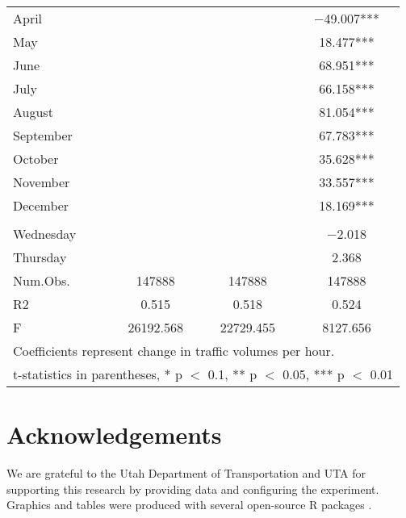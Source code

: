 \documentclass[3p, authoryear]{elsarticle} %
\begin{document}
\begin{table}
\begin{tabular}[t]{lccc}
\hspace{1em}April &  &  & \num{-49.007}***\\
\hspace{1em}May &  &  & \num{18.477}***\\
\hspace{1em}June &  &  & \num{68.951}***\\
\hspace{1em}July &  &  & \num{66.158}***\\
\hspace{1em}August &  &  & \num{81.054}***\\
\hspace{1em}September &  &  & \num{67.783}***\\
\hspace{1em}October &  &  & \num{35.628}***\\
\hspace{1em}November &  &  & \num{33.557}***\\
\hspace{1em}December &  &  & \num{18.169}***\\
\addlinespace[0.3em]
\multicolumn{4}{l}{\textbf{Day}}\\
\hspace{1em}Wednesday &  &  & \num{-2.018}\\
\hspace{1em}Thursday &  &  & \num{2.368}\\
\midrule
Num.Obs. & \num{147888} & \num{147888} & \num{147888}\\
R2 & \num{0.515} & \num{0.518} & \num{0.524}\\
F & \num{26192.568} & \num{22729.455} & \num{8127.656}\\
\bottomrule
\multicolumn{4}{l}{\rule{0pt}{1em}Coefficients represent change in traffic volumes per hour.}\\
\multicolumn{4}{l}{\rule{0pt}{1em}t-statistics in parentheses, * p $<$ 0.1, ** p $<$ 0.05, *** p $<$ 0.01}\\
\end{tabular}
\end{table}

\hypertarget{acknowledgements}{%
\section{Acknowledgements}\label{acknowledgements}}

We are grateful to the Utah Department of Transportation and UTA for supporting
this research by providing data and configuring the experiment. Graphics and
tables were produced with several open-source R packages \citep{modelsummary, Wickham2016-kz, kableExtra}.


\end{document}
